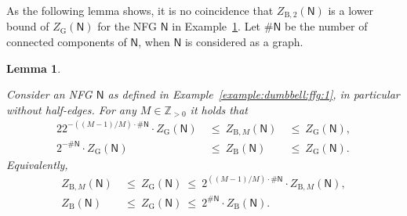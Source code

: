 \documentclass[journal, twocolumn]{IEEEtran}
\renewcommand{\leq}{\leqslant}
\newcommand{\Z}{\mathbb{Z}}
\newcommand{\Zpp}{\Z_{>0}}
\newcommand{\graph}[1]{\mathsf{#1}}
\newcommand{\graphN}{\graph{N}}
\newcommand{\ZBethe}{Z_{\mathrm{B}}}
\newcommand{\ZBetheM}[1]{Z_{\mathrm{B}, #1}}
\newcommand{\?}{\mathrm{?}}
\newcommand{\ZGibbs}{Z_{\mathrm{G}}}
\newtheorem{Lemma}{Lemma}
\newcommand{\ncomponents}{\#}
\begin{document}
As the following lemma shows, it is no coincidence that $\ZBetheM{2}(\graphN)$
is a lower bound of $\ZGibbs(\graphN)$ for the NFG $\graphN$ in
Example~\ref{lemma:circuit:NFG:1}. Let $\ncomponents\graphN$ be the number of
connected components of $\graphN$, when $\graphN$ is considered as a graph.


\begin{Lemma}
  \label{lemma:circuit:NFG:1}

  Consider an NFG $\graphN$ as defined in
  Example~\ref{example:dumbbell:ffg:1}, in particular without half-edges. For
  any $M \in \Zpp$ it holds that
  \begin{alignat}{2}
    2^{-((M-1)/M) \cdot \ncomponents\graphN}
      \cdot
      \ZGibbs(\graphN)
      &\ \leq \ 
    \ZBetheM{M}(\graphN)
      &{} \ \leq \ 
         \ZGibbs(\graphN), \nonumber \\
    2^{-\ncomponents\graphN}
      \cdot
      \ZGibbs(\graphN)
      &{} \ \leq \ 
    \ZBethe(\graphN)
      &\ \leq \ 
         \ZGibbs(\graphN).
           \label{eq:lemma:circuit:NFG:ZBethe:1}
  \end{alignat}
  Equivalently,
  \begin{align}
    \ZBetheM{M}(\graphN)
      &\ \leq \ 
         \ZGibbs(\graphN)
       \ \leq \
         2^{((M-1)/M) \cdot \ncomponents\graphN}
           \cdot
           \ZBetheM{M}(\graphN), \nonumber \\
    \ZBethe(\graphN)
      &\ \leq \ 
         \ZGibbs(\graphN)
       \ \leq \ 
         2^{\ncomponents\graphN}
           \cdot
           \ZBethe(\graphN).
             \label{eq:lemma:circuit:NFG:ZBethe:2}
  \end{align}
  
\end{Lemma}
\end{document}
